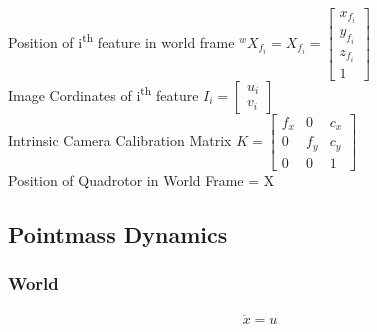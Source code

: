 \documentclass{paper}
\begin{document}
Position of i\textsuperscript{th} feature in world frame
${}^{w}X_{f_{i}} = X_{f_{i}} = 
\begin{bmatrix} x_{f_{i}}\\y_{f_{i}}\\z_{f_{i}}\\1 \end{bmatrix}$\\

Image Cordinates of i\textsuperscript{th} feature
$I_{i} =\begin{bmatrix} u_{i}\\v_{i} \end{bmatrix} $\\

Intrinsic Camera Calibration  Matrix 
$K = \begin{bmatrix} f_{x} & 0 & c_{x} \\ 0 & f_{y} & c_{y}\\ 0 & 0 & 1  \end{bmatrix} $\\

Position of Quadrotor in World Frame = X
\subsection{Pointmass Dynamics}

\subsubsection{World}
\begin{gather}
\ddot{x} = u
\end{gather}
\end{document}
